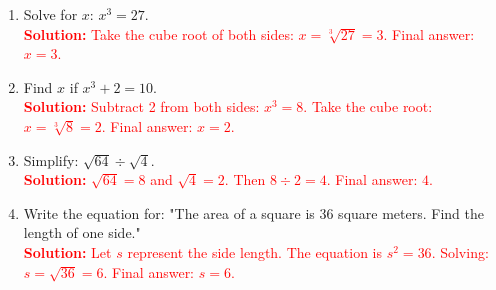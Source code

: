 \documentclass[10pt]{article}
\begin{document}
\vspace{1em}
\begin{tcolorbox}[colframe=black!60, colback=white, 
coltitle=black, colbacktitle=black!15, fonttitle=\bfseries\Large, 
title=Exercises (Part 2), halign title=center, left=10pt, right=10pt, top=10pt, bottom=40pt]
\begin{enumerate}[start=6, itemsep=2.5em]
    \item Solve for \(x\): \( x^3 = 27 \).\\
    \textcolor{red}{\textbf{Solution:} Take the cube root of both sides: \(x = \sqrt[3]{27} = 3\). Final answer: \(x = 3\).}

    \item Find \(x\) if \(x^3 + 2 = 10\).\\
    \textcolor{red}{\textbf{Solution:} Subtract 2 from both sides: \(x^3 = 8\). Take the cube root: \(x = \sqrt[3]{8} = 2\). Final answer: \(x = 2\).}

    \item Simplify: \( \sqrt{64} \div \sqrt{4} \).\\
    \textcolor{red}{\textbf{Solution:} \( \sqrt{64} = 8\) and \( \sqrt{4} = 2\). Then \(8 \div 2 = 4\). Final answer: \(4\).}

    \item Write the equation for: "The area of a square is 36 square meters. Find the length of one side."\\
    \textcolor{red}{\textbf{Solution:} Let \(s\) represent the side length. The equation is \(s^2 = 36\). Solving: \(s = \sqrt{36} = 6\). Final answer: \(s = 6\).}
\end{enumerate}
\end{tcolorbox}
\end{document}
